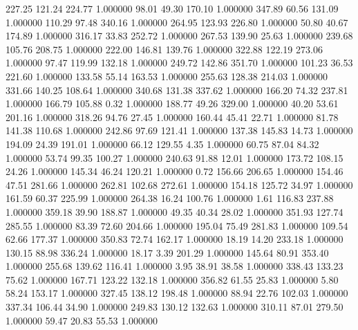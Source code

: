     227.25    121.24    224.77  1.000000
     98.01     49.30    170.10  1.000000
    347.89     60.56    131.09  1.000000
    110.29     97.48    340.16  1.000000
    264.95    123.93    226.80  1.000000
     50.80     40.67    174.89  1.000000
    316.17     33.83    252.72  1.000000
    267.53    139.90     25.63  1.000000
    239.68    105.76    208.75  1.000000
    222.00    146.81    139.76  1.000000
    322.88    122.19    273.06  1.000000
     97.47    119.99    132.18  1.000000
    249.72    142.86    351.70  1.000000
    101.23     36.53    221.60  1.000000
    133.58     55.14    163.53  1.000000
    255.63    128.38    214.03  1.000000
    331.66    140.25    108.64  1.000000
    340.68    131.38    337.62  1.000000
    166.20     74.32    237.81  1.000000
    166.79    105.88      0.32  1.000000
    188.77     49.26    329.00  1.000000
     40.20     53.61    201.16  1.000000
    318.26     94.76     27.45  1.000000
    160.44     45.41     22.71  1.000000
     81.78    141.38    110.68  1.000000
    242.86     97.69    121.41  1.000000
    137.38    145.83     14.73  1.000000
    194.09     24.39    191.01  1.000000
     66.12    129.55      4.35  1.000000
     60.75     87.04     84.32  1.000000
     53.74     99.35    100.27  1.000000
    240.63     91.88     12.01  1.000000
    173.72    108.15     24.26  1.000000
    145.34     46.24    120.21  1.000000
      0.72    156.66    206.65  1.000000
    154.46     47.51    281.66  1.000000
    262.81    102.68    272.61  1.000000
    154.18    125.72     34.97  1.000000
    161.59     60.37    225.99  1.000000
    264.38     16.24    100.76  1.000000
      1.61    116.83    237.88  1.000000
    359.18     39.90    188.87  1.000000
     49.35     40.34     28.02  1.000000
    351.93    127.74    285.55  1.000000
     83.39     72.60    204.66  1.000000
    195.04     75.49    281.83  1.000000
    109.54     62.66    177.37  1.000000
    350.83     72.74    162.17  1.000000
     18.19     14.20    233.18  1.000000
    130.15     88.98    336.24  1.000000
     18.17      3.39    201.29  1.000000
    145.64     80.91    353.40  1.000000
    255.68    139.62    116.41  1.000000
      3.95     38.91     38.58  1.000000
    338.43    133.23     75.62  1.000000
    167.71    123.22    132.18  1.000000
    356.82     61.55     25.83  1.000000
      5.80     58.24    153.17  1.000000
    327.45    138.12    198.48  1.000000
     88.94     22.76    102.03  1.000000
    337.34    106.44     34.90  1.000000
    249.83    130.12    132.63  1.000000
    310.11     87.01    279.50  1.000000
     59.47     20.83     55.53  1.000000
